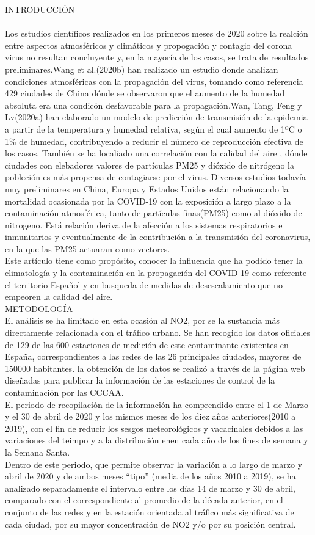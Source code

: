 \documentclass[a4paper,11pt]{article}
\begin{document}
INTRODUCCIÓN
\\ \\ Los estudios científicos realizados en los primeros meses de 2020 sobre la realción entre aspectos atmosféricos y climáticos y propogación y contagio del corona virus no resultan concluyente y, en la mayoría de los casos, se trata de resultados preliminares.Wang et al.(2020b) han realizado un estudio donde analizan condiciones atmosféricas con la propagación del virus, tomando como referencia 429 ciudades de China dónde se observaron que el aumento de la humedad absoluta era una condicón desfavorable para la propagación.Wan, Tang, Feng y Lv(2020a) han elaborado un modelo de predicción de transmisión de la epidemia a partir de la temperatura y humedad relativa, según el cual aumento de 1ºC o 1\% de humedad, contribuyendo a reducir el número de reproducción efectiva de los casos. También se ha localiado una correlación con la calidad del aire , dónde ciudades con elebadores valores de partículas PM25 y dióxido de nitrógeno la pobleción es más propensa de contagiarse por el virus.
Diversos estudios todavía muy preliminares en China, Europa y Estados Unidos están relacionando la mortalidad ocasionada por la COVID-19 con la exposición a largo plazo a la contaminación atmosférica, tanto de partículas finas(PM25) como al dióxido de nitrogeno. Está relación deriva de la afección a los sistemas respiratorios e inmunitarios y eventualmente de la contribución a la transmisión del coronavirus, en la que las PM25 actuaran como vectores.
\\ Este artículo tiene como propósito, conocer la influencia que ha podido tener la climatología y la contaminación en la propagación del COVID-19 como referente el territorio Español y en busqueda de medidas de desescalamiento que no empeoren la calidad del aire.
\\ METODOLOGÍA
\\ El análisis se ha limitado en esta ocasión al NO2, por se la sustancia más directamente relacionada con el tráfico urbano. Se han recogido los datos oficiales de 129 de las 600 estaciones de medición de este contaminante existentes en España, correspondientes a las redes de las 26 principales ciudades, mayores de 150000 habitantes. la obtención de los datos se realizó a través de la página web diseñadas para publicar la información de las estaciones de control de la contaminación por las CCCAA.
\\El periodo de recopilación de la información ha comprendido entre el 1 de Marzo y el 30 de abril de 2020 y los mismos meses de los diez años anteriores(2010 a 2019), con el fin de reducir los sesgos meteorológicos y vacacinales debidos a las variaciones del teimpo y a la distribución enen cada año de los fines de semana y la Semana Santa.
\\Dentro de este periodo, que permite observar la variación a lo largo de marzo y abril de 2020 y
de ambos meses “tipo” (media de los años 2010 a 2019), se ha analizado separadamente el intervalo
entre los días 14 de marzo y 30 de abril, comparado con el correspondiente al promedio de la
década anterior, en el conjunto de las redes y en la estación orientada al tráfico más significativa
de cada ciudad, por su mayor concentración de NO2 y/o por su posición central.
\end{document}
